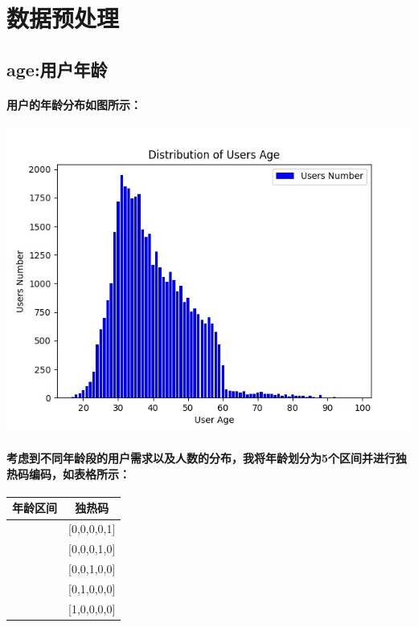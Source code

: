 \documentclass{ctexart}
\begin{document}
    \section{数据预处理}
        \subsection{age:用户年龄}
        \paragraph{
            用户的年龄分布如图所示：
        }
        \begin{center}
            \includegraphics{age.jpg}
        \end{center}
        \paragraph{
        考虑到不同年龄段的用户需求以及人数的分布，我将年龄划分为5个区间并进行独热码编码，如表格所示：
        }
        \begin{center}
            \begin{tabular}{|c|c|}
                \hline
                年龄区间 & 独热码 \\
                \hline
                [17,25] & [0,0,0,0,1] \\
                \hline
                [25,35] & [0,0,0,1,0] \\
                \hline
                [35,45] & [0,0,1,0,0] \\
                \hline
                [45,60] & [0,1,0,0,0] \\
                \hline
                [60,98] & [1,0,0,0,0] \\
                \hline
            \end{tabular}
        \end{center}
\end{document}
